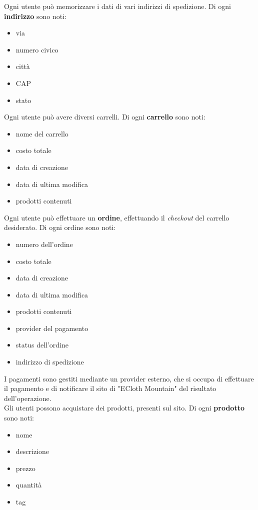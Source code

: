 \documentclass[11pt]{article}
\begin{document}
Ogni utente può memorizzare i dati di vari indirizzi di spedizione. Di ogni
\textbf{indirizzo} sono noti:

\begin{itemize}
	\item via
	\item numero civico
	\item città
	\item CAP
	\item stato
\end{itemize}

Ogni utente può avere diversi carrelli. Di ogni \textbf{carrello} sono noti:

\begin{itemize}
	\item nome del carrello
	\item costo totale
	\item data di creazione
	\item data di ultima modifica
	\item prodotti contenuti
\end{itemize}

Ogni utente può effettuare un \textbf{ordine}, effettuando il \textit{checkout}
del carrello desiderato. Di ogni ordine sono noti:

\begin{itemize}
	\item numero dell'ordine
	\item costo totale
	\item data di creazione
	\item data di ultima modifica
	\item prodotti contenuti
	\item provider del pagamento
	\item status dell'ordine
	\item indirizzo di spedizione
\end{itemize}

I pagamenti sono gestiti mediante un provider esterno, che si occupa di
effettuare il pagamento e di notificare il sito di "ECloth Mountain" del
risultato dell'operazione. \\
Gli utenti possono acquistare dei prodotti, presenti sul sito. Di ogni
\textbf{prodotto} sono noti:

\begin{itemize}
	\item nome
	\item descrizione
	\item prezzo
	\item quantità
	\item tag
\end{itemize}
\end{document}
